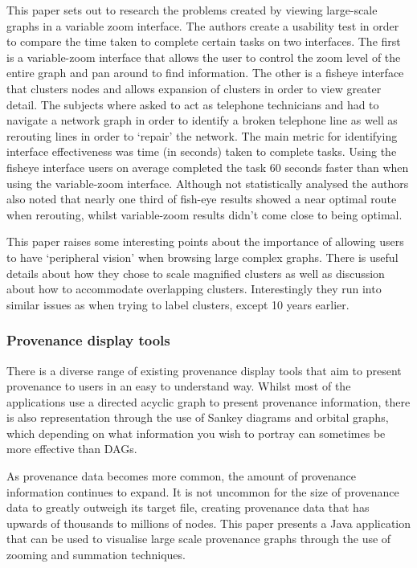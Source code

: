 This paper sets out to research the problems created by viewing large-scale graphs in a variable zoom interface. The authors create a usability test in order to compare the time taken to complete certain tasks on two interfaces. The first is a variable-zoom interface that allows the user to control the zoom level of the entire graph and pan around to find information. The other is a fisheye interface that clusters nodes and allows expansion of clusters in order to view greater detail. The subjects where asked to act as telephone technicians and had to navigate a network graph in order to identify a broken telephone line as well as rerouting lines in order to `repair' the network. The main metric for identifying interface effectiveness was time (in seconds) taken to complete tasks. Using the fisheye interface users on average completed the task 60 seconds faster than when using the variable-zoom interface. Although not statistically analysed the authors also noted that nearly one third of fish-eye results showed a near optimal route when rerouting, whilst variable-zoom results didn't come close to being optimal.

This paper raises some interesting points about the importance of allowing users to have `peripheral vision' when browsing large complex graphs. There is useful details about how they chose to scale magnified clusters as well as discussion about how to accommodate overlapping clusters. Interestingly they run into similar issues as \cite{Abello2006} when trying to label clusters, except 10 years earlier.  

\subsubsection{Provenance display tools}

There is a diverse range of existing provenance display tools that aim to present provenance to users in an easy to understand way. Whilst most of the applications use a directed acyclic graph to present provenance information, there is also representation through the use of Sankey diagrams and orbital graphs, which depending on what information you wish to portray can sometimes be more effective than DAGs.


As provenance data becomes more common, the amount of provenance information continues to expand. It is not uncommon for the size of provenance data to greatly outweigh its target file, creating provenance data that has upwards of thousands to millions of nodes. This paper presents a Java application that can be used to visualise large scale provenance graphs through the use of zooming and summation techniques.

